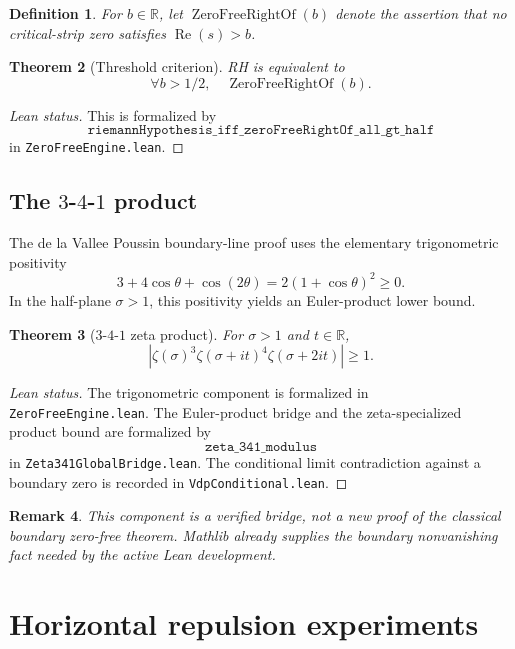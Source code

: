 \documentclass[11pt]{amsart}
\newtheorem{theorem}{Theorem}[section]
\newtheorem{definition}[theorem]{Definition}
\newtheorem{remark}[theorem]{Remark}
\newcommand{\R}{\mathbb{R}}
\newcommand{\zetaR}{\zeta}
\newcommand{\re}{\operatorname{Re}}
\newcommand{\lean}[1]{\texttt{#1}}
\begin{document}
\begin{definition}
For \(b\in\R\), let \(\operatorname{ZeroFreeRightOf}(b)\) denote the assertion
that no critical-strip zero satisfies \(\re(s)>b\).
\end{definition}

\begin{theorem}[Threshold criterion]
RH is equivalent to
\[
  \forall b>1/2,\quad \operatorname{ZeroFreeRightOf}(b).
\]
\end{theorem}

\begin{proof}[Lean status]
This is formalized by
\[
  \lean{riemannHypothesis\_iff\_zeroFreeRightOf\_all\_gt\_half}
\]
in \lean{ZeroFreeEngine.lean}.
\end{proof}

\subsection{The \(3\)-\(4\)-\(1\) product}

The de la Vallee Poussin boundary-line proof uses the elementary trigonometric
positivity
\[
  3+4\cos\theta+\cos(2\theta)=2(1+\cos\theta)^2\geq 0.
\]
In the half-plane \(\sigma>1\), this positivity yields an Euler-product lower
bound.

\begin{theorem}[\(3\)-\(4\)-\(1\) zeta product]
For \(\sigma>1\) and \(t\in\R\),
\[
  \left|\zetaR(\sigma)^3
    \zetaR(\sigma+it)^4
    \zetaR(\sigma+2it)\right|\geq 1.
\]
\end{theorem}

\begin{proof}[Lean status]
The trigonometric component is formalized in \lean{ZeroFreeEngine.lean}.  The
Euler-product bridge and the zeta-specialized product bound are formalized by
\[
  \lean{zeta\_341\_modulus}
\]
in \lean{Zeta341GlobalBridge.lean}.  The conditional limit contradiction
against a boundary zero is recorded in \lean{VdpConditional.lean}.
\end{proof}

\begin{remark}
This component is a verified bridge, not a new proof of the classical boundary
zero-free theorem.  Mathlib already supplies the boundary nonvanishing fact
needed by the active Lean development.
\end{remark}

\section{Horizontal repulsion experiments}
\end{document}
